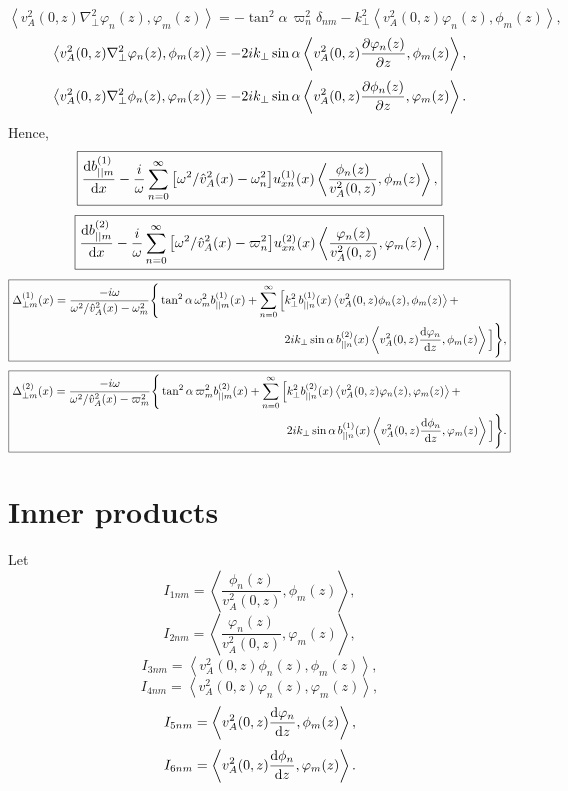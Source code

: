 \documentclass{article}
\begin{document}
\[\left\langle v_A^2(0,z)\nabla_\perp^2\varphi_n(z),\varphi_m(z)\right\rangle=-\tan^2\alpha\,\varpi_n^2\delta_{nm}-k_\perp^2\left\langle v_A^2(0,z)\varphi_n(z),\phi_m(z)\right\rangle,\]
\[\left\langle v_A^2(0,z)\nabla_\perp^2\varphi_n(z),\phi_m(z)\right\rangle=-2ik_\perp\sin\alpha\left\langle v_A^2(0,z)\pdv{\varphi_n(z)}{z},\phi_m(z)\right\rangle,\]
\[\left\langle v_A^2(0,z)\nabla_\perp^2\phi_n(z),\varphi_m(z)\right\rangle=-2ik_\perp\sin\alpha\left\langle v_A^2(0,z)\pdv{\phi_n(z)}{z},\varphi_m(z)\right\rangle.\]
Hence,
\[\boxed{
\dv{b_{||m}^{(1)}}{x}-\frac{i}{\omega}\sum_{n=0}^\infty\qty[\omega^2/\hat{v}_A^2(x) - \omega_n^2]u_{xn}^{(1)}(x)\left\langle\frac{\phi_n(z)}{v_A^2(0,z)},\phi_m(z)\right\rangle
,}\]
\[\boxed{
\dv{b_{||m}^{(2)}}{x}-\frac{i}{\omega}\sum_{n=0}^\infty\qty[\omega^2/\hat{v}_A^2(x) - \varpi_n^2]u_{xn}^{(2)}(x)\left\langle\frac{\varphi_n(z)}{v_A^2(0,z)},\varphi_m(z)\right\rangle
,}\]
\[\boxed{\begin{aligned}
\Delta_{\perp m}^{(1)}(x)=\frac{-i\omega }{\omega^2/\hat{v}_{A}^2(x)-\omega_m^2}\Bigg\{\tan^2\alpha\, \omega_m^2b_{||m}^{(1)}(x)+\sum_{n=0}^\infty\Big[& k_\perp^2b_{||n}^{(1)}(x)\left\langle v_A^2(0,z)\phi_n(z),\phi_m(z)\right\rangle + \\
&2ik_\perp \sin\alpha\, b_{||n}^{(2)}(x)\left\langle v_A^2(0,z)\dv{\varphi_n}{z},\phi_m(z)\right\rangle\Big]\Bigg\},
\end{aligned}}\]
\[\boxed{\begin{aligned}
\Delta_{\perp m}^{(2)}(x)=\frac{-i\omega }{\omega^2/\hat{v}_{A}^2(x)-\varpi_m^2}\Bigg\{\tan^2\alpha\, \varpi_m^2b_{||m}^{(2)}(x)+\sum_{n=0}^\infty\Big[& k_\perp^2b_{||n}^{(2)}(x)\left\langle v_A^2(0,z)\varphi_n(z),\varphi_m(z)\right\rangle + \\
&2ik_\perp \sin\alpha\, b_{||n}^{(1)}(x)\left\langle v_A^2(0,z)\dv{\phi_n}{z},\varphi_m(z)\right\rangle\Big]\Bigg\}.
\end{aligned}}\]

\section*{Inner products}

Let
\[I_{1nm} = \left\langle\frac{\phi_n(z)}{v_A^2(0,z)},\phi_m(z)\right\rangle,\]
\[I_{2nm} = \left\langle\frac{\varphi_n(z)}{v_A^2(0,z)},\varphi_m(z)\right\rangle,\]
\[I_{3nm} = \left\langle v_A^2(0,z)\phi_n(z),\phi_m(z)\right\rangle,\]
\[I_{4nm} = \left\langle v_A^2(0,z)\varphi_n(z),\varphi_m(z)\right\rangle,\]
\[I_{5nm} = \left\langle v_A^2(0,z)\dv{\varphi_n}{z},\phi_m(z)\right\rangle,\]
\[I_{6nm} = \left\langle v_A^2(0,z)\dv{\phi_n}{z},\varphi_m(z)\right\rangle.\]
\end{document}
